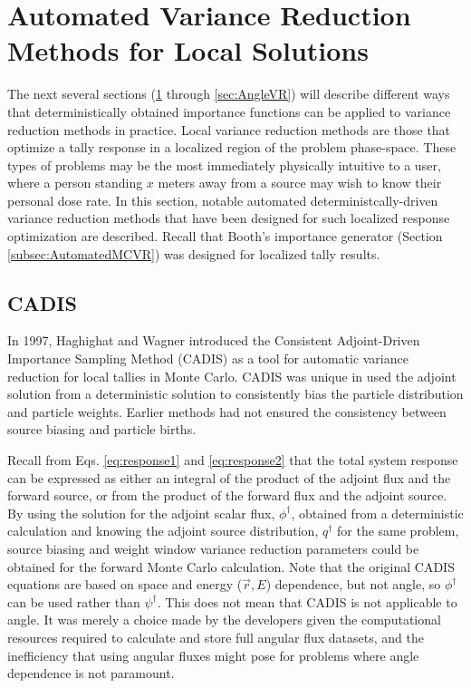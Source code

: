 \section{Automated Variance Reduction Methods for Local Solutions}
\label{sec:localVR}

The next several sections (\ref{sec:localVR} through \ref{sec:AngleVR})
will describe different ways that deterministically obtained importance
functions
can be applied to variance reduction methods in practice. Local variance
reduction methods are those that optimize a tally response in a localized region
of the problem phase-space. These types of problems may be the most immediately
physically intuitive to a user,
where a person standing $x$ meters away from a source may wish to know their
personal dose rate. In this section, notable
automated deterministcally-driven variance reduction methods that
have been designed for such localized response optimization are described.
Recall that Booth's importance generator (Section \ref{subsec:AutomatedMCVR})
was designed for localized tally results.

\subsection{CADIS}
\label{sec:CADIS}

In 1997, Haghighat and Wagner introduced the Consistent Adjoint-Driven
Importance Sampling Method (CADIS)
\cite{wagner_automatic_1997,wagner_automated_1998,haghighat_monte_2003} as a
tool for automatic variance reduction for local tallies in Monte Carlo. CADIS
was unique in used the adjoint solution from a deterministic solution to
consistently bias the particle distribution and particle weights. Earlier
methods had not ensured the consistency between source biasing and particle
births.

Recall from  Eqs. \eqref{eq:response1} and \eqref{eq:response2} that the total
system response can be expressed as either an integral of the product of the
adjoint flux and the forward source, or from the product of the forward flux and
the adjoint source. By using the solution for the adjoint scalar
flux, $\phi^{\dagger}$, obtained from a deterministic calculation
and knowing the adjoint source distribution, $q^{\dagger}$ for the same problem,
source biasing and weight window variance reduction parameters could be obtained
for the forward Monte Carlo calculation. Note that the original CADIS equations
are based on space and energy ($\vec{r}, E$) dependence, but not angle, so
$\phi^{\dagger}$ can be used rather than $\psi^{\dagger}$. This does not mean
that CADIS is not applicable to angle. It was merely a choice made by the
developers given the computational resources required to calculate and store
full angular flux datasets, and the inefficiency that using angular fluxes might
pose for problems where angle dependence is not paramount.

